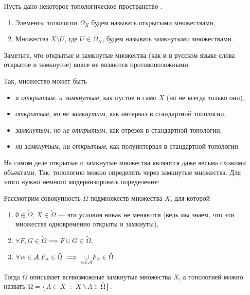 \begin{Def}
    Пусть дано некоторое топологическое пространство \topX.
    \begin{enumerate}
        \item Элементы топологии $\Omega_X$  будем называть открытыми множествами,
        \item Множества $X\setminus U$, где $U\in \Omega_X$, будем называть замкнутыми множествами.
    \end{enumerate}
\end{Def}
\begin{Note}
   Заметьте, что открытые и замкнутые множества (как и в русском языке слова открытое и замкнутое) вовсе не являются противоположными.

   Так, множество может быть 
   \begin{itemize}
       \item \textit{и открытым, и замкнутым}, как пустое и само $X$ (но не всегда только они),
       \item \textit{открытым, но не замкнутым}, как интервал в стандартной топологии,
       \item \textit{замкнутым, но не открытым}, как отрезок в стандартной топологии,
       \item \textit{ни замкнутым, ни открытым}, как полуинтервал в стандартной топологии.
   \end{itemize}
\end{Note}

\begin{Note}
    На самом деле открытые и замкнутые множества являются даже весьма схожими объектами. Так, топологию можно определять через замкнутые множества. Для этого нужно немного модернизировать определение:

    Рассмотрим совокупность $\tilde{\Omega}$ подмножеств множества $X$, для которой 
    \begin{enumerate}
        \item $\emptyset \in \tilde\Omega$, $X \in \tilde\Omega$ --- эти условия никак не меняются (ведь мы знаем, что эти множества одновременно открыты и замкнуты),
        \item $\forall F, G \in \tilde\Omega \implies F \cup G \in \tilde\Omega$,
        \item $\forall \alpha \in \mathcal{A} \; F_\alpha \in \tilde\Omega \implies \underset{\tiny \alpha\in\mathcal{A}}{\cup}F_\alpha \in \tilde\Omega $.
    \end{enumerate}
    Тогда $\tilde\Omega$ описывает всевозможные замкнутые множества $X$, а топологией можно назвать $\Omega = \left\{ A\subset X \st X \setminus A \in \tilde\Omega \right\}$.
\end{Note}

